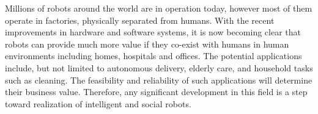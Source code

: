 \documentclass[3p]{elsarticle}
\begin{document}

Millions of robots around the world are in operation today, however most of them operate in factories, physically separated from humans. With the recent improvements in hardware and software systems, it is now becoming clear that robots can provide much more value if they co-exist with humans in human environments including homes, hospitals and offices. The potential applications include, but not limited to autonomous delivery, elderly care, and household tasks such as cleaning. The feasibility and reliability of such applications will determine their business value. Therefore, any significant development in this field is a step toward realization of intelligent and social robots.
\end{document}
